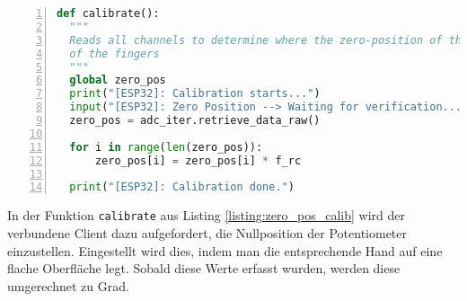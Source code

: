 \documentclass[paper=a4,12pt]{scrreprt}
\begin{document}
\begin{lstlisting}[caption={Firmware: Funktion zur Nullpunktbestimmung}, captionpos=b, label={listing:zero_pos_calib}, language=python, morekeywords={async, await}, numbers=left,
  stepnumber=1]
def calibrate():
  """
  Reads all channels to determine where the zero-position of the potentiometers are, needed to measure the positions
  of the fingers
  """
  global zero_pos
  print("[ESP32]: Calibration starts...")
  input("[ESP32]: Zero Position --> Waiting for verification...\n")
  zero_pos = adc_iter.retrieve_data_raw()

  for i in range(len(zero_pos)):
      zero_pos[i] = zero_pos[i] * f_rc

  print("[ESP32]: Calibration done.")
\end{lstlisting}

In der Funktion \texttt{calibrate} aus Listing \ref{listing:zero_pos_calib} wird der verbundene Client dazu aufgefordert, die Nullposition der Potentiometer einzustellen. Eingestellt wird dies, indem man die entsprechende Hand auf eine flache
Oberfläche legt. Sobald diese Werte erfasst wurden, werden diese umgerechnet zu Grad.\newline
\end{document}
